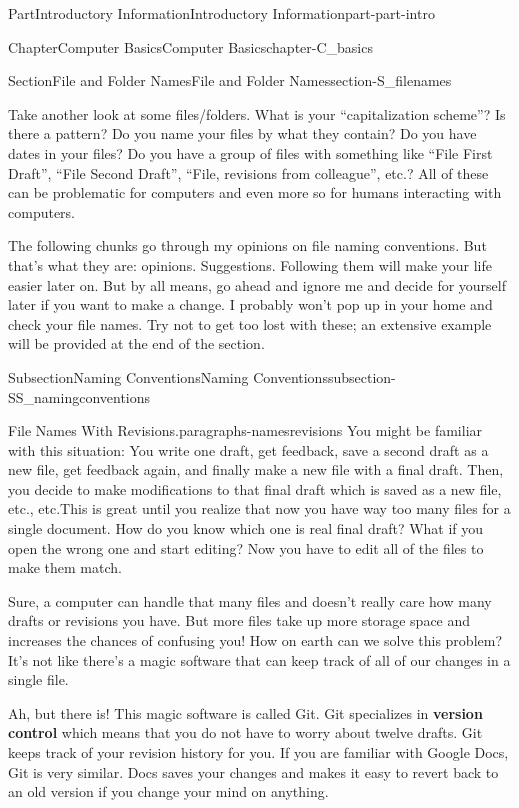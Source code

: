 \documentclass[oneside,10pt,]{book}
\newcommand{\terminology}[1]{\textbf{#1}}
\begin{document}
\begin{partptx}{Part}{Introductory Information}{}{Introductory Information}{}{}{part-part-intro}
\begin{chapterptx}{Chapter}{Computer Basics}{}{Computer Basics}{}{}{chapter-C_basics}
\begin{sectionptx}{Section}{File and Folder Names}{}{File and Folder Names}{}{}{section-S_filenames}
\begin{introduction}{}
Take another look at some files\slash{}folders. What is your ``capitalization scheme''? Is there a pattern? Do you name your files by what they contain? Do you have dates in your files? Do you have a group of files with something like ``File First Draft'', ``File Second Draft'', ``File, revisions from colleague'', etc.? All of these can be problematic for computers and even more so for humans interacting with computers.%
\par
The following chunks go through my opinions on file naming conventions. But that's what they are: opinions. Suggestions. Following them will make your life easier later on. But by all means, go ahead and ignore me and decide for yourself later if you want to make a change. I probably won't pop up in your home and check your file names. Try not to get too lost with these; an extensive example will be provided at the end of the section.%
\end{introduction}%
%
%
\typeout{************************************************}
\typeout{************************************************}
%
\begin{subsectionptx}{Subsection}{Naming Conventions}{}{Naming Conventions}{}{}{subsection-SS_namingconventions}
\begin{paragraphs}{File Names With Revisions.}{paragraphs-namesrevisions}%
%
%
You might be familiar with this situation: You write one draft, get feedback, save a second draft as a new file, get feedback again, and finally make a new file with a final draft. Then, you decide to make modifications to that final draft which is saved as a new file, etc., etc.This is great until you realize that now you have way too many files for a single document. How do you know which one is real final draft? What if you open the wrong one and start editing? Now you have to edit all of the files to make them match.%
\par
Sure, a computer can handle that many files and doesn't really care how many drafts or revisions you have. But more files take up more storage space and increases the chances of confusing you! How on earth can we solve this problem? It's not like there's a magic software that can keep track of all of our changes in a single file.%
\par
Ah, but there is! This magic software is called Git. Git specializes in \terminology{version control} which means that you do not have to worry about twelve drafts. Git keeps track of your revision history for you. If you are familiar with Google Docs, Git is very similar. Docs saves your changes and makes it easy to revert back to an old version if you change your mind on anything.%

\end{paragraphs}
\end{subsectionptx}
\end{sectionptx}
\end{chapterptx}
\end{partptx}
\end{document}
